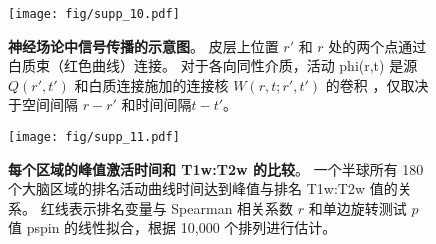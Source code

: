 \documentclass[lang=cn,a4paper,newtx]{elegantpaper}
\begin{document}
\begin{figure}[!htb] 
	\centering
	\texttt{[image: fig/supp\_10.pdf]}
	\caption{\textbf{神经场论中信号传播的示意图}。
		皮层上位置 $ r' $ 和 $ r $ 处的两个点通过白质束（红色曲线）连接。 对于各向同性介质，活动 phi(r,t) 是源 $ Q(r',t') $ 和白质连接施加的连接核 $ W(r,t;r',t') $ 的卷积 ，仅取决于空间间隔 $ r-r' $ 和时间间隔$  t-t' $。
	} \label{fig:supp_10}
\end{figure}


\begin{figure}[!htb] 
	\centering
	\texttt{[image: fig/supp\_11.pdf]}
	\caption{
		\textbf{每个区域的峰值激活时间和 T1w:T2w 的比较}。
		一个半球所有 180 个大脑区域的排名活动曲线时间达到峰值与排名 T1w:T2w 值的关系。
		红线表示排名变量与 Spearman 相关系数 $ r $ 和单边旋转测试 $ p $ 值 pspin 的线性拟合，根据 10,000 个排列进行估计。
	} \label{fig:supp_11}
\end{figure}














\nocite{*}
\printbibliography[heading=bibintoc, title=\ebibname]

\appendix
\addappheadtotoc
\end{document}
